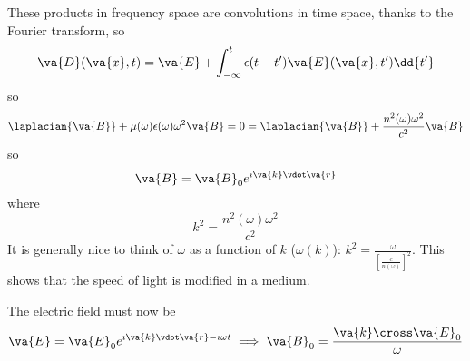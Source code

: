 \documentclass[a4paper,twoside,master.tex]{subfiles}
\begin{document}
These products in frequency space are convolutions in time space, thanks to the Fourier transform, so
\begin{equation}
    \va{D}(\va{x},t) = \va{E} + \int_{- \infty}^t \epsilon(t-t') \va{E}(\va{x}, t') \dd{t'}
\end{equation}
so
\begin{equation}
    \laplacian{\va{B}} + \mu(\omega) \epsilon(\omega) \omega^2 \va{B} = 0 = \laplacian{\va{B}} + \frac{n^2(\omega) \omega^2}{c^2} \va{B}
\end{equation}
so
\begin{equation}
    \va{B} = \va{B}_0 e^{\imath \va{k} \vdot \va{r}}
\end{equation}
where
\begin{equation}
    k^2 = \frac{n^2(\omega) \omega^2}{c^2}
\end{equation}
It is generally nice to think of $\omega$ as a function of $ k $ ($ \omega(k) $): $ k^2 = \frac{\omega}{\left[ \frac{c}{n(\omega)} \right]^2} $. This shows that the speed of light is modified in a medium.

The electric field must now be
\begin{equation}
    \va{E} = \va{E}_0 e^{\imath \va{k} \vdot \va{r} - \imath \omega t} \implies \va{B}_0 = \frac{\va{k} \cross \va{E}_0}{\omega}
\end{equation}
\end{document}
